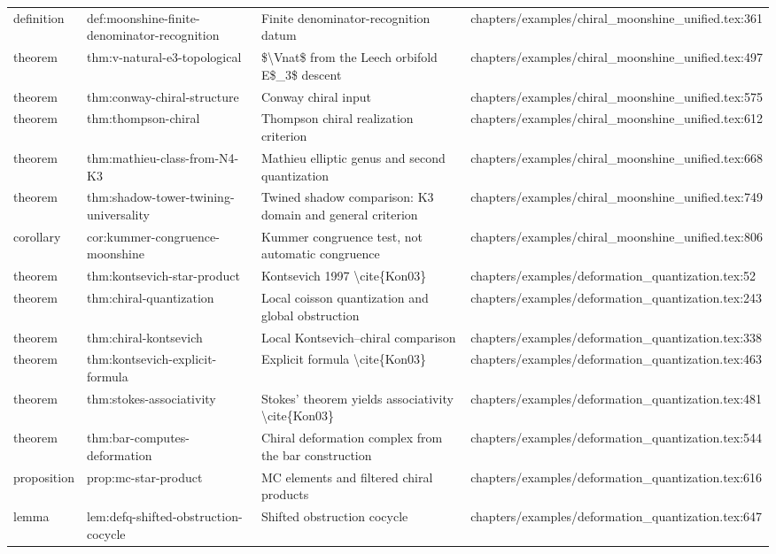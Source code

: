 \documentclass[11pt]{article}
\begin{document}
\begin{longtable}{L{0.10\textwidth}L{0.26\textwidth}L{0.42\textwidth}L{0.22\textwidth}}
definition & def:moonshine-finite-denominator-recognition & Finite denominator-recognition datum & chapters/examples/chiral\_moonshine\_unified.tex:361\\
theorem & thm:v-natural-e3-topological & \$\textbackslash{}Vnat\$ from the Leech orbifold E\$\_3\$ descent & chapters/examples/chiral\_moonshine\_unified.tex:497\\
theorem & thm:conway-chiral-structure & Conway chiral input & chapters/examples/chiral\_moonshine\_unified.tex:575\\
theorem & thm:thompson-chiral & Thompson chiral realization criterion & chapters/examples/chiral\_moonshine\_unified.tex:612\\
theorem & thm:mathieu-class-from-N4-K3 & Mathieu elliptic genus and second quantization & chapters/examples/chiral\_moonshine\_unified.tex:668\\
theorem & thm:shadow-tower-twining-universality & Twined shadow comparison: K3 domain and general criterion & chapters/examples/chiral\_moonshine\_unified.tex:749\\
corollary & cor:kummer-congruence-moonshine & Kummer congruence test, not automatic congruence & chapters/examples/chiral\_moonshine\_unified.tex:806\\
theorem & thm:kontsevich-star-product & Kontsevich 1997 \textbackslash{}cite\{Kon03\} & chapters/examples/deformation\_quantization.tex:52\\
theorem & thm:chiral-quantization & Local coisson quantization and global obstruction & chapters/examples/deformation\_quantization.tex:243\\
theorem & thm:chiral-kontsevich & Local Kontsevich--chiral comparison & chapters/examples/deformation\_quantization.tex:338\\
theorem & thm:kontsevich-explicit-formula & Explicit formula \textbackslash{}cite\{Kon03\} & chapters/examples/deformation\_quantization.tex:463\\
theorem & thm:stokes-associativity & Stokes' theorem yields associativity \textbackslash{}cite\{Kon03\} & chapters/examples/deformation\_quantization.tex:481\\
theorem & thm:bar-computes-deformation & Chiral deformation complex from the bar construction & chapters/examples/deformation\_quantization.tex:544\\
proposition & prop:mc-star-product & MC elements and filtered chiral products & chapters/examples/deformation\_quantization.tex:616\\
lemma & lem:defq-shifted-obstruction-cocycle & Shifted obstruction cocycle & chapters/examples/deformation\_quantization.tex:647\\

\end{longtable}
\end{document}
